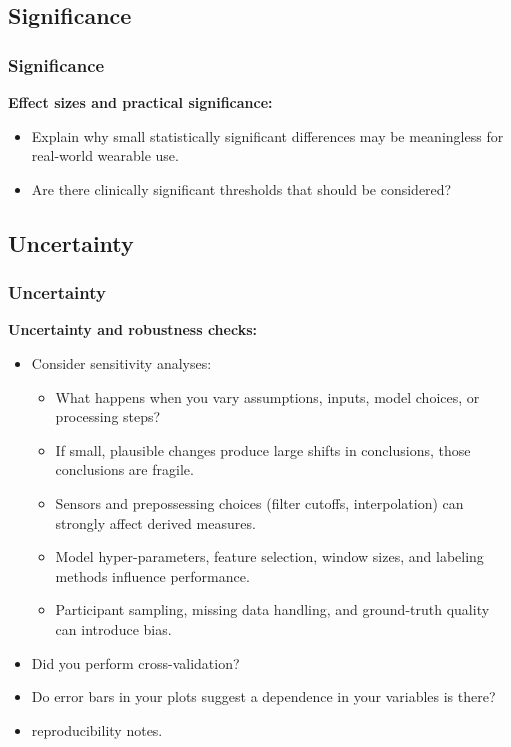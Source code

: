 \documentclass[aspectratio=169]{beamer} %
\begin{document}
	\subsection{Significance}
	\begin{frame}
	\frametitle{Significance}
		{\bf Effect sizes and practical significance:}
		\begin{itemize}
			\item Explain why small statistically significant differences may be meaningless for real-world wearable use.
			\item Are there clinically significant thresholds that should be considered?
		\end{itemize}
	\end{frame}

	\subsection{Uncertainty}
	\begin{frame}
	\frametitle{Uncertainty}
		{\bf Uncertainty and robustness checks:}
		\begin{itemize}
			\item Consider sensitivity analyses:
				\begin{itemize}
					\item What happens when you vary assumptions, inputs, model choices, or processing steps?
					\item If small, plausible changes produce large shifts in conclusions, those conclusions are fragile.
					\item Sensors and prepossessing choices (filter cutoffs, interpolation) can strongly affect derived measures.
					\item Model hyper-parameters, feature selection, window sizes, and labeling methods influence performance.
					\item Participant sampling, missing data handling, and ground-truth quality can introduce bias.
				\end{itemize}
			\item Did you perform cross-validation?
			\item Do error bars in your plots suggest a dependence in your variables is there?
			\item reproducibility notes.
		\end{itemize}
	\end{frame}
\end{document}
